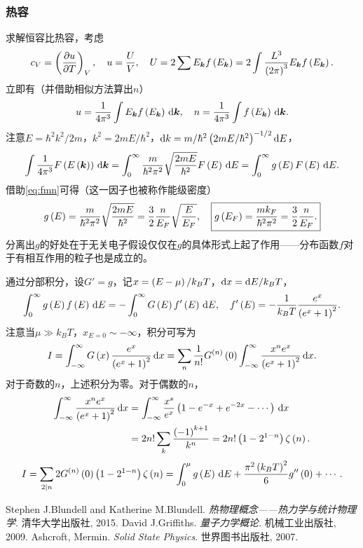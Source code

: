 \documentclass{ctexart}
\begin{document}
\subsubsection{热容}
求解恒容比热容，考虑
\[ c_V = \left(\frac{\partial u}{\partial T}\right)_V, \quad u=\frac{U}{V}, \quad U = 2 \sum E_{\boldsymbol{k}}f\left(E_{\boldsymbol{k}}\right)= 2 \int \frac{L^3}{\left(2\pi\right)^3} E_{\boldsymbol{k}}f\left(E_{\boldsymbol{k}}\right). \]
立即有（并借助相似方法算出$n$）
\[ u = \frac{1}{4\pi^3}\int E_{\boldsymbol{k}}f\left(E_{\boldsymbol{k}}\right) \,\mathrm{d} \boldsymbol{k}, \quad n = \frac{1}{4\pi^3}\int f\left(E_{\boldsymbol{k}}\right) \,\mathrm{d} \boldsymbol{k}. \]
注意$E=\hbar^2 k^2/2m$，$k^2=2mE/\hbar^2$，$\mathrm{d} k = m/\hbar^2\left(2mE/\hbar^2\right)^{-1/2}\mathrm{d} E$，
\[ \int \frac{1}{4\pi^3}F\left(E\left(\boldsymbol{k}\right)\right) \,\mathrm{d} \boldsymbol{k} = \int_0^{\infty} \frac{m}{\hbar^2\pi^2}\sqrt{\frac{2mE}{\hbar^2}}F\left(E\right) \,\mathrm{d} E = \int_0^{\infty} g\left(E\right)F\left(E\right) \,\mathrm{d} E. \]
借助\eqref{eq:fmn}可得（这一因子也被称作能级密度）
\[ g\left(E\right) = \frac{m}{\hbar^2\pi^2}\sqrt{\frac{2mE}{\hbar^2}} = \frac{3}{2}\frac{n}{E_F}\sqrt{\frac{E}{E_F}},\quad \boxed{ g\left(E_F\right) = \frac{mk_F}{\hbar^2\pi^2} = \frac{3}{2}\frac{n}{E_F}. }  \]
分离出$g$的好处在于无关电子假设仅仅在$g$的具体形式上起了作用——分布函数$f$对于有相互作用的粒子也是成立的。
\par
通过分部积分，设$G'=g$，记$x=\left(E-\mu\right)/k_BT$，$\mathrm{d} x = \mathrm{d} E/k_BT$，
\[ \int_0^{\infty} g\left(E\right)f\left(E\right) \,\mathrm{d} E = -\int_0^{\infty} G\left(E\right)f'\left(E\right) \,\mathrm{d} E,\quad f'\left(E\right) = -\frac{1}{k_BT}\frac{e^x}{\left(e^x+1\right)^2}. \]
注意当$\mu\gg k_BT$，$x_{E=0}\sim-\infty$，积分可写为
\[ I = \int_{-\infty}^{\infty} G\left(x\right)\frac{e^x}{\left(e^x+1\right)^2} \,\mathrm{d} x = \sum_n \frac{1}{n!}G^{\left(n\right)}\left(0\right)\int_{-\infty}^{\infty} \frac{x^ne^x}{\left(e^x+1\right)^2} \,\mathrm{d} x. \]
对于奇数的$n$，上述积分为零。对于偶数的$n$，
\begin{align*}
\int_{-\infty}^{\infty} \frac{x^ne^x}{\left(e^x+1\right)^2} \,\mathrm{d} x &= \int_{-\infty}^{\infty} \frac{x^s}{e^x}\left(1-e^{-x}+e^{-2x}-\cdots\right) \,\mathrm{d} x \\
&= 2n!\sum_k\frac{\left(-1\right)^{k+1}}{k^n} = 2n!\left(1-2^{1-n}\right)\zeta\left(n\right).
\end{align*}
\begin{align*}
I = \sum_{2|n} 2G^{\left(n\right)}\left(0\right)\left(1-2^{1-n}\right)\zeta\left(n\right) = \int_0^{\mu} g\left(E\right) \,\mathrm{d} E + \frac{\pi^2\left(k_BT\right)^2}{6}g''\left(0\right)+\cdots.
\end{align*}

\newpage
\begin{thebibliography}{9}
Stephen J.Blundell and Katherine M.Blundell.
\textit{热物理概念——热力学与统计物理学}. 
清华大学出版社, 2015.
David J.Griffiths.
\textit{量子力学概论}. 
机械工业出版社, 2009.
Ashcroft, Mermin.
\textit{Solid State Physics}. 
世界图书出版社, 2007.
\end{thebibliography}
\end{document}
